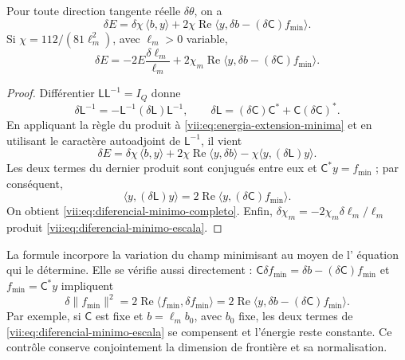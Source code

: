 \begin{theorem}
\label{vii:thm:diferencial-minimo}
Pour toute direction tangente réelle \(\delta\theta\), on a
\begin{equation}
 \delta E
 =\delta\chi\,\langle b,y\rangle
   +2\chi\operatorname{Re}
       \langle y,\delta b-(\delta\mathsf C)f_{\min}\rangle.
 \label{vii:eq:diferencial-minimo-completo}
\end{equation}
Si \(\chi=112/(81\ell_m^2)\), avec \(\ell_m>0\) variable,
\begin{equation}
 \delta E=-2E\frac{\delta\ell_m}{\ell_m}
 +2\chi_m\operatorname{Re}
       \langle y,\delta b-(\delta\mathsf C)f_{\min}\rangle.
 \label{vii:eq:diferencial-minimo-escala}
\end{equation}
\end{theorem}

\begin{proof}
Différentier \(\mathsf L\mathsf L^{-1}=I_Q\) donne
\[
 \delta\mathsf L^{-1}
 =-\mathsf L^{-1}(\delta\mathsf L)\mathsf L^{-1},\qquad
 \delta\mathsf L=(\delta\mathsf C)\mathsf C^*
                      +\mathsf C(\delta\mathsf C)^*.
\]
En appliquant la règle du produit à \eqref{vii:eq:energia-extension-minima} et en utilisant le caractère autoadjoint de \(\mathsf L^{-1}\), il vient
\[
 \delta E=\delta\chi\,\langle b,y\rangle
 +2\chi\operatorname{Re}\langle y,\delta b\rangle
 -\chi\langle y,(\delta\mathsf L)y\rangle.
\]
Les deux termes du dernier produit sont conjugués entre eux et
\(\mathsf C^*y=f_{\min}\) ; par conséquent,
\[
 \langle y,(\delta\mathsf L)y\rangle
 =2\operatorname{Re}\langle y,(\delta\mathsf C)f_{\min}\rangle.
\]
On obtient \eqref{vii:eq:diferencial-minimo-completo}. Enfin, \(\delta\chi_m=-2\chi_m\delta\ell_m/\ell_m\) produit \eqref{vii:eq:diferencial-minimo-escala}.
\end{proof}

La formule incorpore la variation du champ minimisant au moyen de l'
équation qui le détermine. Elle se vérifie aussi directement :
\(\mathsf C\delta f_{\min}=\delta b-(\delta\mathsf C)f_{\min}\)
et \(f_{\min}=\mathsf C^*y\) impliquent
\[
 \delta\|f_{\min}\|^2
 =2\operatorname{Re}\langle f_{\min},\delta f_{\min}\rangle
 =2\operatorname{Re}
     \langle y,\delta b-(\delta\mathsf C)f_{\min}\rangle.
\]
Par exemple, si \(\mathsf C\) est fixe et \(b=\ell_m b_0\), avec
\(b_0\) fixe, les deux termes de
\eqref{vii:eq:diferencial-minimo-escala} se compensent et l'énergie
reste constante. Ce contrôle conserve conjointement la dimension
de frontière et sa normalisation.

